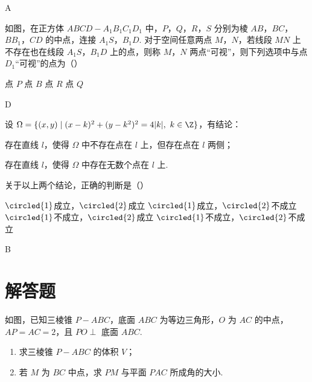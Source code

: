 \begin{answer}
A
\end{answer}

\begin{problem}
如图，在正方体 \(ABCD-A_1B_1C_1D_1\) 中，\(P\)，\(Q\)，\(R\)，\(S\) 分别为棱 \(AB\)，\(BC\)，\(BB_1\)，\(CD\) 的中点，连接 \(A_1S\)，\(B_1D\). 对于空间任意两点 \(M\)，\(N\)，若线段 \(MN\) 上不存在也在线段 \(A_1S\)，\(B_1D\) 上的点，则称 \(M\)，\(N\) 两点“可视”，则下列选项中与点 \(D_1\)“可视”的点为（\quad）


\choices
    {点 \(P\)}
    {点 \(B\)}
    {点 \(R\)}
    {点 \(Q\)}
\end{problem}

\begin{answer}
D
\end{answer}

\begin{problem}
设 \(\Omega=\{(x,y)\mid (x-k)^2+(y-k^2)^2=4|k|,\ k\in\Z\}\)，有结论：
\begin{circlelist}
\item 存在直线 \(l\)，使得 \(\Omega\) 中不存在点在 \(l\) 上，但存在点在 \(l\) 两侧；
\item 存在直线 \(l\)，使得 \(\Omega\) 中存在无数个点在 \(l\) 上.
\end{circlelist}
关于以上两个结论，正确的判断是（\quad）

\choices
    {\(\circled{1}\)成立，\(\circled{2}\)成立}
    {\(\circled{1}\)成立，\(\circled{2}\)不成立}
    {\(\circled{1}\)不成立，\(\circled{2}\)成立}
    {\(\circled{1}\)不成立，\(\circled{2}\)不成立}
\end{problem}

\begin{answer}
B
\end{answer}

\section{解答题}

\begin{problem}
如图，已知三棱锥 \(P-ABC\)，底面 \(ABC\) 为等边三角形，\(O\) 为 \(AC\) 的中点，\(AP=AC=2\)，且 \(PO\perp\) 底面 \(ABC\).
\begin{enumerate}
\item 求三棱锥 \(P-ABC\) 的体积 \(V\)；
\item 若 \(M\) 为 \(BC\) 中点，求 \(PM\) 与平面 \(PAC\) 所成角的大小.
\end{enumerate}

\end{problem}

